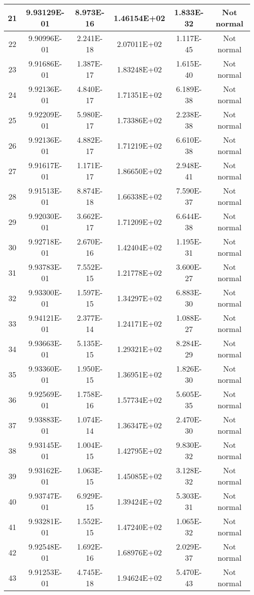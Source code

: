 \begin{table}[h]
\begin{tabular}{|c|c|c|c|c|c|}
		21 & 9.93129E-01 & 8.973E-16 & 1.46154E+02 & 1.833E-32 & Not normal\\\hline
		22 & 9.90996E-01 & 2.241E-18 & 2.07011E+02 & 1.117E-45 & Not normal\\\hline
		23 & 9.91686E-01 & 1.387E-17 & 1.83248E+02 & 1.615E-40 & Not normal\\\hline
		24 & 9.92136E-01 & 4.840E-17 & 1.71351E+02 & 6.189E-38 & Not normal\\\hline
		25 & 9.92209E-01 & 5.980E-17 & 1.73386E+02 & 2.238E-38 & Not normal\\\hline
		26 & 9.92136E-01 & 4.882E-17 & 1.71219E+02 & 6.610E-38 & Not normal\\\hline
		27 & 9.91617E-01 & 1.171E-17 & 1.86650E+02 & 2.948E-41 & Not normal\\\hline
		28 & 9.91513E-01 & 8.874E-18 & 1.66338E+02 & 7.590E-37 & Not normal\\\hline
		29 & 9.92030E-01 & 3.662E-17 & 1.71209E+02 & 6.644E-38 & Not normal\\\hline
		30 & 9.92718E-01 & 2.670E-16 & 1.42404E+02 & 1.195E-31 & Not normal\\\hline
		31 & 9.93783E-01 & 7.552E-15 & 1.21778E+02 & 3.600E-27 & Not normal\\\hline
		32 & 9.93300E-01 & 1.597E-15 & 1.34297E+02 & 6.883E-30 & Not normal\\\hline
		33 & 9.94121E-01 & 2.377E-14 & 1.24171E+02 & 1.088E-27 & Not normal\\\hline
		34 & 9.93663E-01 & 5.135E-15 & 1.29321E+02 & 8.284E-29 & Not normal\\\hline
		35 & 9.93360E-01 & 1.950E-15 & 1.36951E+02 & 1.826E-30 & Not normal\\\hline
		36 & 9.92569E-01 & 1.758E-16 & 1.57734E+02 & 5.605E-35 & Not normal\\\hline
		37 & 9.93883E-01 & 1.074E-14 & 1.36347E+02 & 2.470E-30 & Not normal\\\hline
		38 & 9.93145E-01 & 1.004E-15 & 1.42795E+02 & 9.830E-32 & Not normal\\\hline
		39 & 9.93162E-01 & 1.063E-15 & 1.45085E+02 & 3.128E-32 & Not normal\\\hline
		40 & 9.93747E-01 & 6.929E-15 & 1.39424E+02 & 5.303E-31 & Not normal\\\hline
		41 & 9.93281E-01 & 1.552E-15 & 1.47240E+02 & 1.065E-32 & Not normal\\\hline
		42 & 9.92548E-01 & 1.692E-16 & 1.68976E+02 & 2.029E-37 & Not normal\\\hline
		43 & 9.91253E-01 & 4.745E-18 & 1.94624E+02 & 5.470E-43 & Not normal\\\hline

\end{tabular}
\end{table}
